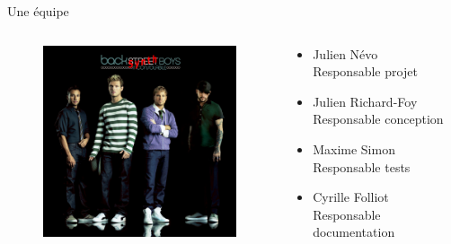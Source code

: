 \documentclass[frenchb]{beamer}
\begin{document}
\begin{frame}{Une équipe}
    \begin{columns}
        \begin{column}[l]{7cm}
            \begin{figure}
                \includegraphics[width=6cm ]{../img/png/back.jpg}
            \end{figure}
        \end{column}
    \begin{column}[l]{9cm}
    \begin{itemize}  
        \item Julien Névo\\\tiny{Responsable projet}\normalsize
        \item Julien Richard-Foy\\\tiny{Responsable conception}\normalsize
        \item Maxime Simon\\\tiny{Responsable tests}\normalsize
        \item Cyrille Folliot\\\tiny{Responsable documentation}\normalsize
    \end{itemize}
    \end{column}
    \end{columns}
\end{frame}
\end{document}
